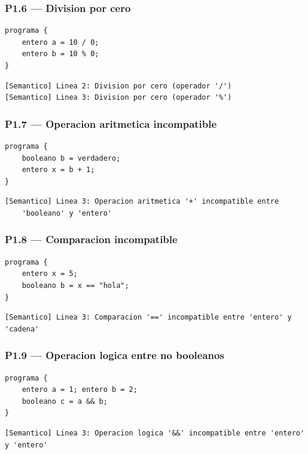 \documentclass[11pt,a4paper]{article}
\begin{document}
\subsubsection{P1.6 --- Division por cero}
\begin{lstlisting}[style=ml]
programa {
    entero a = 10 / 0;
    entero b = 10 % 0;
}
\end{lstlisting}
\begin{lstlisting}[style=err]
[Semantico] Linea 2: Division por cero (operador '/')
[Semantico] Linea 3: Division por cero (operador '%')
\end{lstlisting}

\subsubsection{P1.7 --- Operacion aritmetica incompatible}
\begin{lstlisting}[style=ml]
programa {
    booleano b = verdadero;
    entero x = b + 1;
}
\end{lstlisting}
\begin{lstlisting}[style=err]
[Semantico] Linea 3: Operacion aritmetica '+' incompatible entre
    'booleano' y 'entero'
\end{lstlisting}

\subsubsection{P1.8 --- Comparacion incompatible}
\begin{lstlisting}[style=ml]
programa {
    entero x = 5;
    booleano b = x == "hola";
}
\end{lstlisting}
\begin{lstlisting}[style=err]
[Semantico] Linea 3: Comparacion '==' incompatible entre 'entero' y 'cadena'
\end{lstlisting}

\subsubsection{P1.9 --- Operacion logica entre no booleanos}
\begin{lstlisting}[style=ml]
programa {
    entero a = 1; entero b = 2;
    booleano c = a && b;
}
\end{lstlisting}
\begin{lstlisting}[style=err]
[Semantico] Linea 3: Operacion logica '&&' incompatible entre 'entero' y 'entero'
\end{lstlisting}
\end{document}
